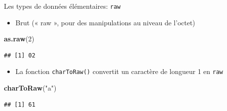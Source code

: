 \documentclass[
  ignorenonframetext,
]{beamer}
\newenvironment{Shaded}{\begin{snugshade}}{\end{snugshade}}
\newcommand{\DecValTok}[1]{\textcolor[rgb]{0.00,0.00,0.81}{#1}}
\newcommand{\FunctionTok}[1]{\textcolor[rgb]{0.13,0.29,0.53}{\textbf{#1}}}
\newcommand{\NormalTok}[1]{#1}
\newcommand{\StringTok}[1]{\textcolor[rgb]{0.31,0.60,0.02}{#1}}
\providecommand{\tightlist}{%
  \setlength{\itemsep}{0pt}\setlength{\parskip}{0pt}}
\begin{document}
\begin{frame}[fragile]{Les types de données élémentaires: \texttt{raw}}
\protect\hypertarget{les-types-de-donnuxe9es-uxe9luxe9mentaires-raw}{}
\begin{itemize}
\tightlist
\item
  Brut (« raw », pour des manipulations au niveau de l'octet)
\end{itemize}

\tiny

\begin{Shaded}
\begin{Highlighting}[]
\FunctionTok{as.raw}\NormalTok{(}\DecValTok{2}\NormalTok{)}
\end{Highlighting}
\end{Shaded}

\begin{verbatim}
## [1] 02
\end{verbatim}

\normalsize

\begin{itemize}
\tightlist
\item
  La fonction \texttt{charToRaw()} convertit un caractère de longueur 1
  en \texttt{raw}
\end{itemize}

\tiny

\begin{Shaded}
\begin{Highlighting}[]
\FunctionTok{charToRaw}\NormalTok{(}\StringTok{"a"}\NormalTok{)}
\end{Highlighting}
\end{Shaded}

\begin{verbatim}
## [1] 61
\end{verbatim}

\normalsize
\end{frame}
\end{document}
